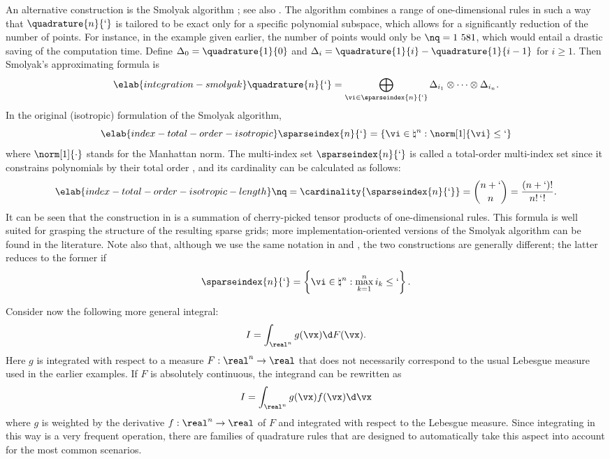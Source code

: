 An alternative construction is the Smolyak algorithm \cite{smolyak1963}; see
also \cite{eldred2008, heiss2008, maitre2010}. The algorithm combines a range of
one-dimensional rules in such a way that $\quadrature{n}{\lq}$ is tailored to be
exact only for a specific polynomial subspace, which allows for a significantly
reduction of the number of points. For instance, in the example given earlier,
the number of points would only be $\nq = 1~581$, which would entail a drastic
saving of the computation time. Define $\Delta_0 = \quadrature{1}{0}$ and
$\Delta_i = \quadrature{1}{i} - \quadrature{1}{i - 1}$ for $i \geq 1$. Then
Smolyak's approximating formula is
\begin{equation} \elab{integration-smolyak}
  \quadrature{n}{\lq} = \bigoplus_{\vi \in \sparseindex{n}{\lq}} \Delta_{i_1} \otimes \cdots \otimes \Delta_{i_n}.
\end{equation}
In the original (isotropic) formulation of the Smolyak algorithm,
\begin{equation} \elab{index-total-order-isotropic}
  \sparseindex{n}{\lq} = \left\{ \vi \in \natural^n: \norm[1]{\vi} \leq \lq \right\}
\end{equation}
where $\norm[1]{\cdot}$ stands for the Manhattan norm. The multi-index set
$\sparseindex{n}{\lq}$ is called a total-order multi-index set since it
constrains polynomials by their total order \cite{eldred2008, beck2011}, and its
cardinality can be calculated as follows:
\begin{equation} \elab{index-total-order-isotropic-length}
  \nq = \cardinality{\sparseindex{n}{\lq}} = {n + \lq \choose n} = \frac{(n + \lq)!}{n! \, \lq!}.
\end{equation}
It can be seen that the construction in  is a
summation of cherry-picked tensor products of one-dimensional rules. This
formula is well suited for grasping the structure of the resulting sparse grids;
more implementation-oriented versions of the Smolyak algorithm can be found in
the literature. Note also that, although we use the same notation in
 and , the two constructions
are generally different; the latter reduces to the former if
\[
  \sparseindex{n}{\lq} = \left\{ \vi \in \natural^n: \max_{k = 1}^n i_k \leq \lq \right\}.
\]

Consider now the following more general integral:
\[
  I = \int_{\real^n} g(\vx) \d F(\vx).
\]
Here $g$ is integrated with respect to a measure $F: \real^n \to \real$
\cite{durrett2010} that does not necessarily correspond to the usual Lebesgue
measure used in the earlier examples. If $F$ is absolutely continuous, the
integrand can be rewritten as
\[
  I = \int_{\real^n} g(\vx) f(\vx) \d \vx
\]
where $g$ is weighted by the derivative $f: \real^n \to \real$ of $F$ and
integrated with respect to the Lebesgue measure. Since integrating in this way
is a very frequent operation, there are families of quadrature rules that are
designed to automatically take this aspect into account for the most common
scenarios.

